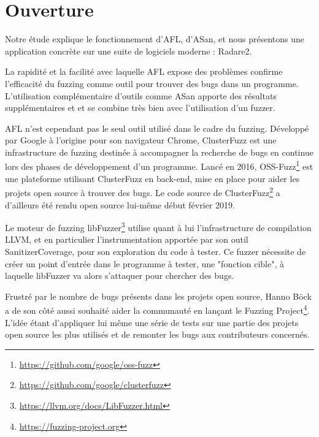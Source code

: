 \chapter{Ouverture}

Notre étude explique le fonctionnement d'AFL, d'ASan, et nous présentons une
application concrète sur une suite de logiciels moderne : Radare2.

La rapidité et la facilité avec laquelle AFL expose des problèmes confirme
l'efficacité du fuzzing comme outil pour trouver des bugs dans un programme.
L'utilisation complémentaire d'outils comme ASan apporte des résultats
supplémentaires et et se combine très bien avec l'utilisation d'un fuzzer.

AFL n'est cependant pas le seul outil utilisé dans le cadre du fuzzing.
Développé par Google à l'origine pour son navigateur Chrome, ClusterFuzz
est une infrastructure de fuzzing destinée à accompagner la recherche de
bugs en continue lors des phases de développement d'un programme.
Lancé en 2016, OSS-Fuzz\footnote{\url{https://github.com/google/oss-fuzz}}
est une plateforme utilisant ClusterFuzz en back-end, mise en place pour
aider les projets open source à trouver des bugs. Le code source de
ClusterFuzz\footnote{\url{https://github.com/google/clusterfuzz}}
a d'ailleurs été rendu open source lui-même début février 2019.

Le moteur de fuzzing libFuzzer\footnote{\url{https://llvm.org/docs/LibFuzzer.html}}
utilise quant à lui l'infrastructure de compilation LLVM, et en particulier
l'instrumentation apportée par son outil SanitizerCoverage, pour son
exploration du code à tester. Ce fuzzer nécessite de créer un point d'entrée
dans le programme à tester, une "fonction cible", à laquelle libFuzzer va
alors s'attaquer pour chercher des bugs.

Frustré par le nombre de bugs présents dans les projets open source, Hanno
Böck a de son côté aussi souhaité aider la communauté en lançant
le Fuzzing Project\footnote{\url{https://fuzzing-project.org}}. L'idée étant
d'appliquer lui même une série de tests sur une partie des projets open
source les plus utilisés et de remonter les bugs aux contributeurs concernés.

